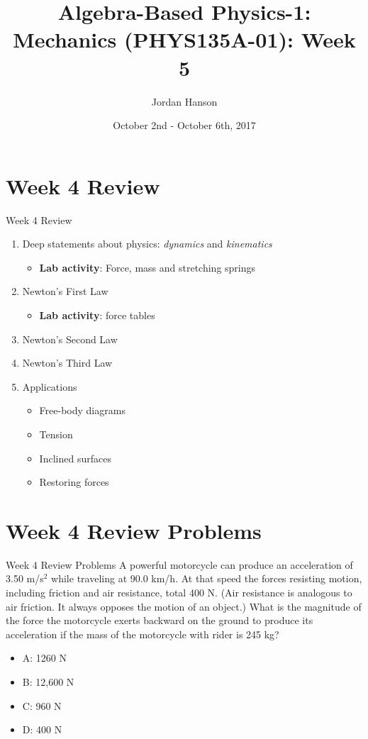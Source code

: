 \documentclass{beamer}
\title{Algebra-Based Physics-1: Mechanics (PHYS135A-01): Week 5}
\date{October 2nd - October 6th, 2017}
\author{Jordan Hanson}
\institute{Whittier College Department of Physics and Astronomy}
\begin{document}
\maketitle

\section{Week 4 Review}

\begin{frame}{Week 4 Review}
\begin{enumerate}
\item Deep statements about physics: \textit{dynamics} and \textit{kinematics}
\begin{itemize}
\item \textbf{Lab activity}: Force, mass and stretching springs
\end{itemize}
\item Newton's \alert{First Law}
\begin{itemize}
\item \textbf{Lab activity}: force tables
\end{itemize}
\item Newton's \alert{Second Law}
\item Newton's \alert{Third Law}
\item Applications
\begin{itemize}
\item Free-body diagrams
\item Tension
\item Inclined surfaces
\item Restoring forces
\end{itemize}
\end{enumerate}
\end{frame}

\section{Week 4 Review Problems}

\begin{frame}{Week 4 Review Problems}
A powerful motorcycle can produce an acceleration of 3.50 m/s$^2$ while traveling at 90.0 km/h. At that speed the forces resisting motion, including friction and air resistance, total 400 N. (Air resistance is analogous to air friction. It always opposes the motion of an object.) What is the magnitude of the force the motorcycle exerts backward on the ground to produce its acceleration if the mass of the motorcycle with rider is 245 kg?
\begin{itemize}
\item A: 1260 N
\item B: 12,600 N
\item C: 960 N
\item D: 400 N
\end{itemize}
\end{frame}
\end{document}
